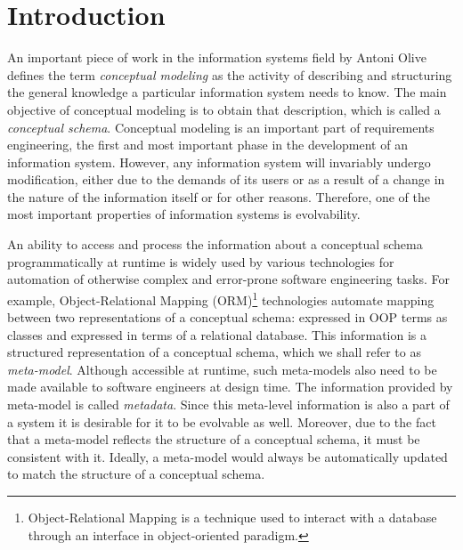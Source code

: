\chapter{Introduction}

An important piece of work in the information systems field by Antoni Olive \cite{CMofIS} defines the term \textit{conceptual modeling} as the activity of describing and structuring the general knowledge a particular information system needs to know.
The main objective of conceptual modeling is to obtain that description, which is called a \textit{conceptual schema}.
Conceptual modeling is an important part of requirements engineering, the first and most important phase in the development of an information system.
However, any information system will invariably undergo modification, either due to the demands of its users or as a result of a change in the nature of the information itself or for other reasons.
Therefore, one of the most important properties of information systems is evolvability.

\n

An ability to access and process the information about a conceptual schema programmatically at runtime is widely used by various technologies for automation of otherwise complex and error-prone software engineering tasks.
For example, Object-Relational Mapping (ORM)\footnote{Object-Relational Mapping is a technique used to interact with a database through an interface in object-oriented paradigm.} technologies automate mapping between two representations of a conceptual schema: expressed in OOP terms as classes and expressed in terms of a relational database.
This information is a structured representation of a conceptual schema, which we shall refer to as \textit{meta-model}.
Although accessible at runtime, such meta-models also need to be made available to software engineers at design time.
The information provided by meta-model is called \textit{metadata}.
Since this meta-level information is also a part of a system it is desirable for it to be evolvable as well.
Moreover, due to the fact that a meta-model reflects the structure of a conceptual schema, it must be consistent with it.
Ideally, a meta-model would always be automatically updated to match the structure of a conceptual schema.

\n

